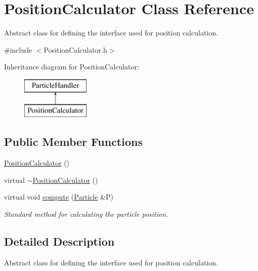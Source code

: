 \hypertarget{classPositionCalculator}{\section{Position\-Calculator Class Reference}
\label{classPositionCalculator}
}


Abstract class for defining the interface used for position calculation.  




{\ttfamily \#include $<$Position\-Calculator.\-h$>$}

Inheritance diagram for Position\-Calculator\-:\begin{figure}[H]
\begin{center}
\leavevmode
\includegraphics[height=2.000000cm]{classPositionCalculator}
\end{center}
\end{figure}
\subsection*{Public Member Functions}
\begin{DoxyCompactItemize}
\item 
\hyperlink{classPositionCalculator_a76d6de8b61a7c00e61be4e68699d65bb}{Position\-Calculator} ()
\item 
virtual \hyperlink{classPositionCalculator_add53461d1bce2131853f5cbda77617bb}{$\sim$\-Position\-Calculator} ()
\item 
virtual void \hyperlink{classPositionCalculator_a484e7688db5348d834931a555ce7aadd}{compute} (\hyperlink{classParticle}{Particle} \&P)
\begin{DoxyCompactList}\small\item\em Standard method for calculating the particle position. \end{DoxyCompactList}\end{DoxyCompactItemize}


\subsection{Detailed Description}
Abstract class for defining the interface used for position calculation. 

